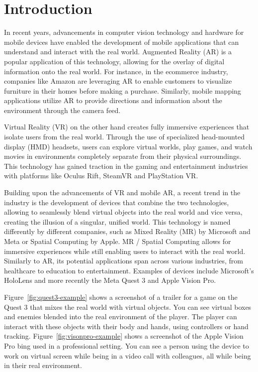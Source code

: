 \chapter{Introduction}
In recent years, advancements in computer vision technology and hardware for mobile devices
have enabled the development of mobile applications that can understand and interact with the real world.
Augmented Reality (AR) is a popular application of this technology,
allowing for the overlay of digital information onto the real world.
For instance, in the ecommerce industry, companies like Amazon are leveraging AR to
enable customers to visualize furniture in their homes before making a purchase.
Similarly, mobile mapping applications utilize AR to provide directions and information about the
environment through the camera feed.

Virtual Reality (VR) on the other hand creates fully immersive experiences
that isolate users from the real world.
Through the use of specialized head-mounted display (HMD) headsets, users can explore virtual worlds,
play games, and watch movies in environments completely separate from their physical surroundings.
This technology has gained traction in the gaming and entertainment industries
with platforms like Oculus Rift, SteamVR and PlayStation VR.

Building upon the advancements of VR and mobile AR,
a recent trend in the industry is the development of devices that combine the two technologies,
allowing to seamlessly blend virtual objects into the real world and vice versa, creating the illusion of a singular, unified world.
This technology is named differently by different companies, such as Mixed Reality (MR) by Microsoft and Meta
or Spatial Computing by Apple.
MR / Spatial Computing allows for immersive experiences while still enabling users to interact with the real world.
Similarly to AR, its potential applications span across various industries, from healthcare to education to entertainment.
Examples of devices include Microsoft's HoloLens and more recently the Meta Quest 3 and Apple Vision Pro.

Figure~\ref{fig:quest3-example} shows a screenshot of a trailer for a game on the Quest 3 that mixes the real world with virtual objects.
You can see virtual boxes and enemies blended into the real environment of the player.
The player can interact with these objects with their body and hands, using controllers or hand tracking.
Figure~\ref{fig:visonpro-example} shows a screenshot of the Apple Vision Pro bing used in a professional setting.
You can see a person using the device to work on virtual screen while being in a video call with colleagues,
all while being in their real environment.

